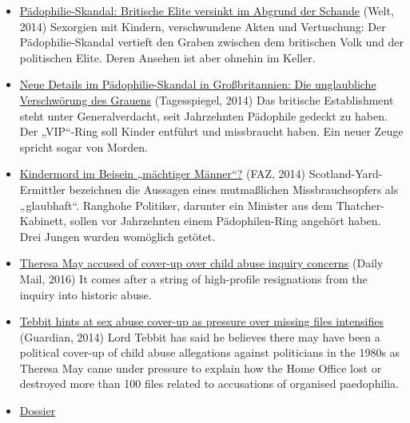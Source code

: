 \begin{itemize}
\tightlist
\item
  \href{https://www.welt.de/politik/ausland/article134848435/Britische-Elite-versinkt-im-Abgrund-der-Schande.html}{Pädophilie-Skandal:
  Britische Elite versinkt im Abgrund der Schande} (Welt, 2014)
  Sexorgien mit Kindern, verschwundene Akten und Vertuschung: Der
  Pädophilie-Skandal vertieft den Graben zwischen dem britischen Volk
  und der politischen Elite. Deren Ansehen ist aber ohnehin im Keller.
\item
  \href{https://www.tagesspiegel.de/politik/neue-details-im-paedophilie-skandal-in-grossbritannien-die-unglaubliche-verschwoerung-des-grauens/11144826.html}{Neue
  Details im Pädophilie-Skandal in Großbritannien: Die unglaubliche
  Verschwörung des Grauens} (Tagesspiegel, 2014) Das britische
  Establishment steht unter Generalverdacht, seit Jahrzehnten Pädophile
  gedeckt zu haben. Der „VIP``-Ring soll Kinder entführt und missbraucht
  haben. Ein neuer Zeuge spricht sogar von Morden.
\item
  \href{https://www.faz.net/aktuell/politik/ausland/grossbritannien-scotland-yard-ermittelt-gegen-paedophilie-ring-13330914.html}{Kindermord
  im Beisein „mächtiger Männer``?} (FAZ, 2014) Scotland-Yard-Ermittler
  bezeichnen die Aussagen eines mutmaßlichen Missbrauchsopfers als
  „glaubhaft``. Ranghohe Politiker, darunter ein Minister aus dem
  Thatcher-Kabinett, sollen vor Jahrzehnten einem Pädophilen-Ring
  angehört haben. Drei Jungen wurden womöglich getötet.
\item
  \href{https://www.independent.co.uk/news/uk/politics/theresa-may-child-abuse-inquiry-cover-up-concerns-dame-lowell-goddard-stories-a7369976.html}{Theresa
  May accused of cover-up over child abuse inquiry concerns} (Daily
  Mail, 2016) It comes after a string of high-profile resignations from
  the inquiry into historic abuse.
\item
  \href{https://www.theguardian.com/uk-news/2014/jul/06/norman-tebbit-theresa-may-cover-up-child-abuse-dossier}{Tebbit
  hints at sex abuse cover-up as pressure over missing files
  intensifies} (Guardian, 2014) Lord Tebbit has said he believes there
  may have been a political cover-up of child abuse allegations against
  politicians in the 1980s as Theresa May came under pressure to explain
  how the Home Office lost or destroyed more than 100 files related to
  accusations of organised paedophilia.
\item
  \href{https://www.ibtimes.co.uk/dossier-vip-westminster-paedophile-sex-ring-names-leading-mps-1480500}{Dossier
}
\end{itemize}
